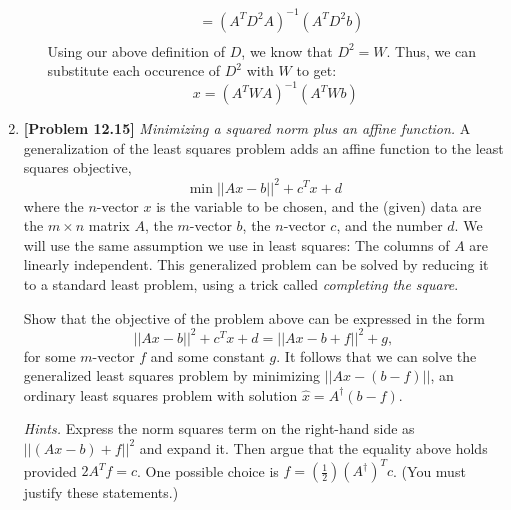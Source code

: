 \begin{enumerate}[label=(\alph*)]
\begin{enumerate}[label=(\alph*)]
\begin{tcolorbox}
$$\begin{aligned}
					              & = (A^TD^2A)^{-1}(A^TD^2b)     \\
				            \end{aligned}$$
			            Using our above definition of $D$, we know that $D^2
				            = W$. Thus, we can substitute each occurence of
			            $D^2$ with $W$ to get:
			            $$ x = (A^TWA)^{-1}(A^TWb) $$
		            \end{tcolorbox}
	      \end{enumerate}
	\item \textbf{[Problem 12.15]} \textit{Minimizing a squared norm plus an
		      affine function.} A generalization of the least squares problem adds an
	      affine function to the least squares objective,
	      $$ \min ||Ax - b||^2 + c^Tx + d$$
	      where the $n$-vector $x$ is the variable to be chosen, and the (given)
	      data are the $m \times n$ matrix $A$, the $m$-vector $b$, the
	      $n$-vector $c$, and the number $d$. We will use the same assumption we
	      use in least squares: The columns of $A$ are linearly independent.
	      This generalized problem can be solved by reducing it to a standard
	      least problem, using a trick called \textit{completing the square}.

	      Show that the objective of the problem above can be expressed in the
	      form
	      $$ ||Ax - b||^2 + c^Tx + d = || Ax - b + f ||^2 +g,$$
	      for some $m$-vector $f$ and some constant $g$. It follows that we can
	      solve the generalized least squares problem by minimizing $||Ax - ( b
		      - f)||$, an ordinary least squares problem with solution $\hat{x} =
		      A^\dagger (b - f)$.

	      \textit{Hints.} Express the norm squares term on the right-hand side
	      as $||(Ax - b) + f||^2$ and expand it. Then argue that the equality
	      above holds provided $2A^Tf = c$. One possible choice is $f =
		      (\frac{1}{2})(A^\dagger)^T c$. (You must justify these statements.)


\end{enumerate}
